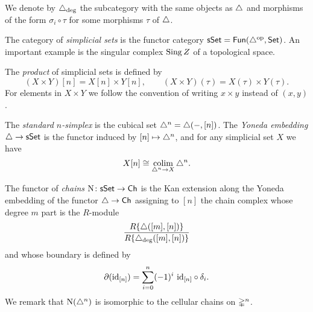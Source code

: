 We denote by $\triangle_{\deg}$ the subcategory with the same objects as $\triangle$ and morphisms of the form $\sigma_i \circ \tau$ for some morphisms $\tau$ of $\triangle$.

The category of \textit{simplicial sets} is the functor category $\mathsf{sSet} = \mathsf{Fun}(\triangle^{\mathrm{op}}, \mathsf{Set})$.
An important example is the singular complex $\operatorname{Sing} Z$ of a topological space.

The \textit{product} of simplicial sets is defined by
\begin{equation*}
(X \times Y)[n] = X[n] \times Y[n], \qquad
(X \times Y)(\tau) = X(\tau) \times Y(\tau).
\end{equation*}
For elements in $X \times Y$ we follow the convention of writing $x \times y$ instead of $(x, y)$.

The \textit{standard $n$-simplex} is the cubical set $\triangle^n = \triangle(-, [n])$.
The \textit{Yoneda embedding} $\triangle \to \mathsf{sSet}$ is the functor induced by $[n] \mapsto \triangle^n$, and for any simplicial set $X$ we have
\begin{equation*}
X[n] \cong \operatorname*{colim}_{\triangle^n \to X} \triangle^n.
\end{equation*}

The functor of \textit{chains} $\operatorname{N} \colon \mathsf{sSet} \to \mathsf{Ch}$ is the Kan extension along the Yoneda embedding of the functor $\triangle \to \mathsf{Ch}$ assigning to $[n]$ the chain complex whose degree $m$ part is the $R$-module
\begin{equation*}
\frac{R\{\triangle([m], [n])\}}{R\{\triangle_{\deg}([m], [n])\}}
\end{equation*}
and whose boundary is defined by
\begin{equation*}
\partial (\mathrm{id}_{[n]}) = \sum_{i=0}^{n} (-1)^i \ \mathrm{id}_{[n]} \circ \delta_i.
\end{equation*}
We remark that $\operatorname{N}(\triangle^n)$ is isomorphic to the cellular chains on $\mathbb{\Delta}^n$.


